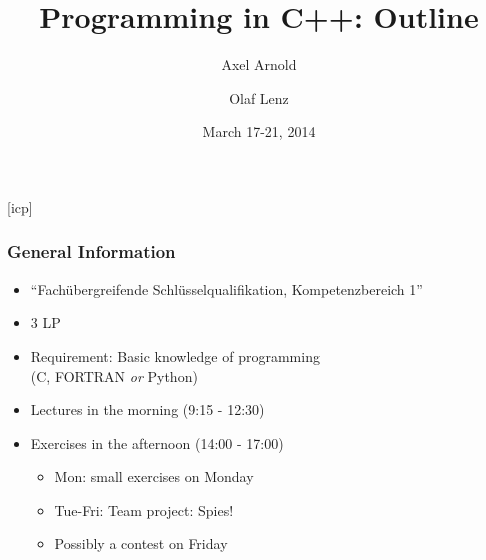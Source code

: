 \documentclass{slides}
\begin{document}
\newcommand{\ie}{\textit{i.\thinspace e.}\xspace}
\newcommand{\eg}{\textit{e.\thinspace g.}\xspace}

\graphicspath{{figures/}}

\title[Programming in C++: Outline]{\Large Programming in C++: Outline}

\author[A. Arnold and O. Lenz]{Axel Arnold \and Olaf Lenz} 
\date{March 17-21, 2014}

\begin{frame}
  \titlepage
\end {frame}
[icp]

\begin{frame}
  \frametitle{General Information}
  \begin{itemize}
  \item ``Fachübergreifende Schlüsselqualifikation, Kompetenzbereich 1''
  \item 3 LP
  \item Requirement: Basic knowledge of programming\\ (C, FORTRAN \emph{or} Python)
  \item Lectures in the morning (9:15 - 12:30)
  \item Exercises in the afternoon (14:00 - 17:00)
    \begin{itemize}
    \item Mon: small exercises on Monday
    \item Tue-Fri: Team project: Spies!
    \item Possibly a contest on Friday
    \end{itemize}
  \end{itemize}
\end{frame}
\end{document}
